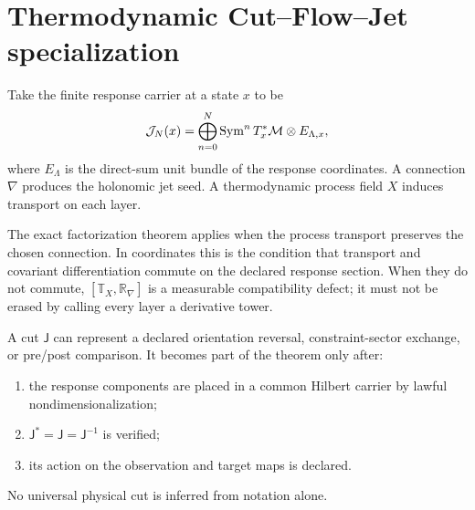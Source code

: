 \section{Thermodynamic Cut--Flow--Jet specialization}

Take the finite response carrier at a state $x$ to be
\[
\mathcal J_N(x)
=\bigoplus_{n=0}^N
\operatorname{Sym}^nT_x^*\mathcal M\otimes E_{\Lambda,x},
\]
where $E_\Lambda$ is the direct-sum unit bundle of the response coordinates.  A connection $\nabla$ produces the holonomic jet seed.  A thermodynamic process field $X$ induces transport on each layer.

The exact factorization theorem applies when the process transport preserves the chosen connection.  In coordinates this is the condition that transport and covariant differentiation commute on the declared response section.  When they do not commute, $[\mathbb T_X,\mathbb R_\nabla]$ is a measurable compatibility defect; it must not be erased by calling every layer a derivative tower.

A cut $\mathsf J$ can represent a declared orientation reversal, constraint-sector exchange, or pre/post comparison.  It becomes part of the theorem only after:
\begin{enumerate}[label=(\roman*)]
\item the response components are placed in a common Hilbert carrier by lawful nondimensionalization;
\item $\mathsf J^*=\mathsf J=\mathsf J^{-1}$ is verified;
\item its action on the observation and target maps is declared.
\end{enumerate}
No universal physical cut is inferred from notation alone.

